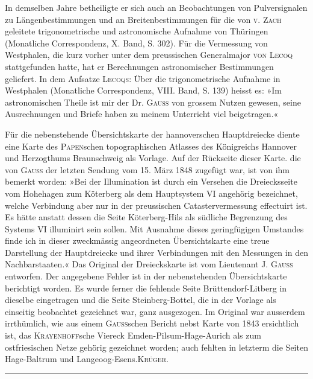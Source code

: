 \par\noindent\hspace*{\parindent}In demselben Jahre betheiligte er sich auch an Beobachtungen von Pulversignalen zu Längenbestimmungen und an Breitenbestimmungen für die von \textsc{v. Zach} geleitete trigonometrische und astronomische Aufnahme von Thüringen (Monatliche Correspondenz, X. Band, S. 302). Für die Vermessung von Westphalen, die kurz vorher unter dem preussischen Generalmajor \textsc{von Lecoq} stattgefunden hatte, hat er Berechnungen astronomischer Bestimmungen geliefert. In dem Aufsatze \textsc{Lecoqs}: Über die trigonometrische Aufnahme in Westphalen (Monatliche Correspondenz, VIII. Band, S. 139) heisst es: »Im astronomischen Theile ist mir der Dr. \textsc{Gauss} von grossem Nutzen gewesen, seine Ausrechnungen und Briefe haben zu meinem Unterricht viel beigetragen.«
\par\bigskip
\par\noindent\hspace*{\parindent}Für die nebenstehende Übersichtskarte der hannoverschen Hauptdreiecke diente eine Karte des \textsc{Papen}schen topographischen Atlasses des Königreichs Hannover und Herzogthums Braunschweig als Vorlage. Auf der Rückseite dieser Karte. die von \textsc{Gauss} der letzten Sendung vom 15. März 1848 zugefügt war, ist von ihm bemerkt worden: »Bei der Illumination ist durch ein Versehen die Dreiecksseite vom Hohehagen zum Köterberg als dem Hauptsystem VI angehörig bezeichnet, welche Verbindung aber nur in der preussischen Catastervermessung effectuirt ist. Es hätte anstatt dessen die Seite Köterberg-Hils als südliche Begrenzung des Systems VI illuminirt sein sollen. Mit Ausnahme dieses geringfügigen Umstandes finde ich in dieser zweckmässig angeordneten Übersichtskarte eine treue Darstellung der Hauptdreiecke und ihrer Verbindungen mit den Messungen in den Nachbarstaaten.« Das Original der Dreieckskarte ist vom Lieutenant J. \textsc{Gauss} entworfen. Der angegebene Fehler ist in der nebenstehenden Übersichtskarte berichtigt worden. Es wurde ferner die fehlende Seite Brüttendorf-Litberg in dieselbe eingetragen und die Seite Steinberg-Bottel, die in der Vorlage als einseitig beobachtet gezeichnet war, ganz ausgezogen. Im Original war ausserdem irrthümlich, wie aus einem \textsc{Gauss}schen Bericht nebst Karte von 1843 ersichtlich ist, das \textsc{Krayenhoff}sche Viereck Emden-Pilsum-Hage-Aurich als zum ostfriesischen Netze gehörig gezeichnet worden; auch fehlten in letzterm die Seiten Hage-Baltrum und Langeoog-Esens.\hfill\textsc{Krüger}.
\begin{center}\rule{2.6cm}{0.4pt}\end{center}
\par\endgroup


